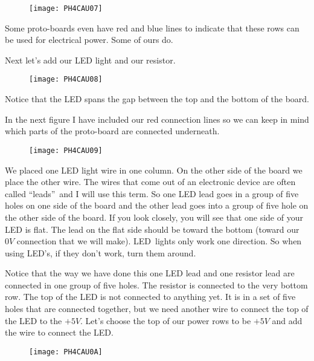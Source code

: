 \begin{figure}[h!]
	\centering
	\texttt{[image: PH4CAU07]}
\end{figure}

Some proto-boards even have red and blue lines to indicate that these rows can be used for electrical power. Some of ours do.

Next let's add our LED light and our resistor. 

\begin{figure}[h!]
	\centering
	\texttt{[image: PH4CAU08]}
\end{figure}

Notice that the LED spans the gap between the top and the bottom of the board.

In the next figure I have included our red connection lines so we can keep in mind which parts of the proto-board are connected underneath.

\begin{figure}[h!]
		\centering
	\texttt{[image: PH4CAU09]}
\end{figure}

We placed one LED light wire in one column. On the other side of the board we place the other wire. The wires that come out of an electronic device are often called \textquotedblleft leads\textquotedblright\ and I will use this term. So one LED lead goes in a group of five holes on one side of the board and the other lead goes into a group of five hole on the other side of the board. If you look closely, you will see that one side of your LED is flat. The lead on the flat side should be toward the bottom (toward our $0\unit{V}$ connection that we will make). LED\ lights only work one direction. So when using LED's, if they don't work, turn them around.

Notice that the way we have done this one LED lead and one resistor lead are connected in one group of five holes. The resistor is connected to the very bottom row. The top of the LED is not connected to anything yet. It is in a set of five holes that are connected together, but we need another wire to connect the top of the LED to the $+5\unit{V}.$ Let's choose the top of our power rows to be $+5\unit{V}$ and add the wire to connect the LED. 

\begin{figure}[h!]
	\centering
	\texttt{[image: PH4CAU0A]}
\end{figure}

